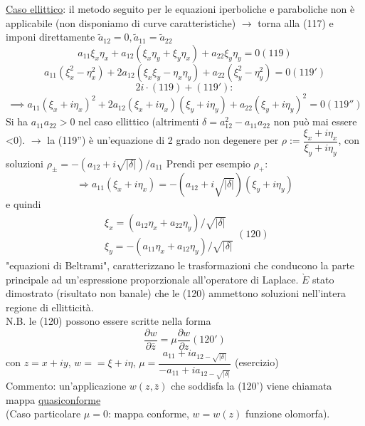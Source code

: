 \documentclass[a4paper,11pt]{report}
\newcommand{\z}{\bar{z}}
\begin{document}
\underline{Caso ellittico}: il metodo seguito per le equazioni iperboliche e paraboliche non è applicabile (non disponiamo di curve caratteristiche) $\rightarrow$ torna alla (117) e imponi direttamente $\tilde{a}_{12}=0,\tilde{a}_{11}=\tilde{a}_{22}$
\begin{equation}
a_{11}\xi_x \eta_x + a_{12}(\xi_x\eta_y + \xi_y\eta_x) + a_{22}\xi_y\eta_y=0(119)
\end{equation}
\begin{equation}
a_{11}(\xi_x^2 - \eta_x^2) + 2a_{12}(\xi_x\xi_y - \eta_x\eta_y) + a_{22}(\xi_y^2 - \eta_y^2)=0
(119')
\end{equation}
$$
2i\cdot(119) + (119'):
$$
\begin{equation}
\implies a_{11}(\xi_x + i\eta_x)^2 + 2a_{12}(\xi_x + i\eta_x)(\xi_y + i\eta_y) + a_{22}(\xi_y + i\eta_y)^2 =0 (119'')
\end{equation}
Si ha $a_{11}a_{22}>0$ nel caso ellittico (altrimenti $\delta =a_{12}^2 - a_{11}a_{22}$ non può mai essere <0). $\rightarrow$ la (119'') è un'equazione di 2 grado non degenere per $\rho:= \dfrac{\xi_x + i\eta_x}{\xi_y + i\eta_y}$, con soluzioni $\rho_{\pm}=-(a_{12} + i\sqrt{|\delta|})/a_{11}$
Prendi per esempio $\rho_+$:
$$
\Rightarrow a_{11} (\xi_x + i\eta_x)=-(a_{12}+i\sqrt{|\delta|})(\xi_y + i \eta_y)
$$
e quindi 
\begin{equation}
\begin{matrix}
\xi_x=(a_{12}\eta_x + a_{22}\eta_y)/\sqrt{|\delta|} \\
\xi_y=-(a_{11}\eta_x + a_{12}\eta_y)/\sqrt{|\delta|} 
\end{matrix}(120)
\end{equation}
"equazioni di Beltrami", caratterizzano le trasformazioni che conducono la parte principale ad un'espressione proporzionale all'operatore di Laplace. $\grave{E}$ stato dimostrato (risultato non banale) che le (120) ammettono soluzioni nell'intera regione di ellitticità.\\
N.B. le (120) possono essere scritte nella forma\\
\begin{equation}
\dfrac{\partial w}{\partial \z}=\mu\dfrac{\partial w}{\partial z} (120')
\end{equation}
con $z=x+iy$, $w==\xi+i\eta$, $\mu=\dfrac{a_{11}+i a_{12 - \sqrt{|\delta|}}}{-a_{11}+i a_{12 - \sqrt{|\delta|}}}$ (esercizio)\\
Commento: un'applicazione $w(z,\z)$ che soddisfa la (120') viene chiamata mappa \underline{quasiconforme}\\
(Caso particolare $\mu=0$: mappa conforme, $w=w(z)$ funzione olomorfa).
\end{document}
